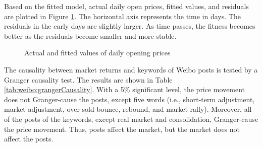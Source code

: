 \documentclass[review,3p,times,12pt,number]{elsarticle}
\begin{document}
Based on the fitted model, actual daily open prices, fitted values, and residuals are plotted in Figure \ref{fig:result}. The horizontal axis represents the time in days. The residuals in the early days are slightly larger. As time passes, the fitness becomes better as the residuals become smaller and more stable.
\begin{figure}[htbp]
\center
{}
\caption{Actual and fitted values of daily opening prices}
\label{fig:result}
\end{figure}

The causality between market returns and keywords of Weibo posts is tested by a Granger causality test. The results are shown in Table \ref{tab:weibo:grangerCausality}. With a 5\% significant level, the price movement does not Granger-cause the posts, except five words (i.e., short-term adjustment, market adjustment, over-sold bounce, rebound, and market rally). Moreover, all of the posts of the keywords, except real market and consolidation, Granger-cause the price movement. Thus, posts affect the market, but the market does not affect the posts.
\end{document}
